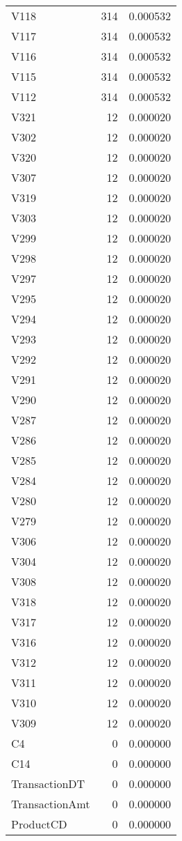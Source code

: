 \begin{tabular}{lrr}
V118 & 314 & 0.000532 \\
V117 & 314 & 0.000532 \\
V116 & 314 & 0.000532 \\
V115 & 314 & 0.000532 \\
V112 & 314 & 0.000532 \\
V321 & 12 & 0.000020 \\
V302 & 12 & 0.000020 \\
V320 & 12 & 0.000020 \\
V307 & 12 & 0.000020 \\
V319 & 12 & 0.000020 \\
V303 & 12 & 0.000020 \\
V299 & 12 & 0.000020 \\
V298 & 12 & 0.000020 \\
V297 & 12 & 0.000020 \\
V295 & 12 & 0.000020 \\
V294 & 12 & 0.000020 \\
V293 & 12 & 0.000020 \\
V292 & 12 & 0.000020 \\
V291 & 12 & 0.000020 \\
V290 & 12 & 0.000020 \\
V287 & 12 & 0.000020 \\
V286 & 12 & 0.000020 \\
V285 & 12 & 0.000020 \\
V284 & 12 & 0.000020 \\
V280 & 12 & 0.000020 \\
V279 & 12 & 0.000020 \\
V306 & 12 & 0.000020 \\
V304 & 12 & 0.000020 \\
V308 & 12 & 0.000020 \\
V318 & 12 & 0.000020 \\
V317 & 12 & 0.000020 \\
V316 & 12 & 0.000020 \\
V312 & 12 & 0.000020 \\
V311 & 12 & 0.000020 \\
V310 & 12 & 0.000020 \\
V309 & 12 & 0.000020 \\
C4 & 0 & 0.000000 \\
C14 & 0 & 0.000000 \\
TransactionDT & 0 & 0.000000 \\
TransactionAmt & 0 & 0.000000 \\
ProductCD & 0 & 0.000000 \\

\end{tabular}
